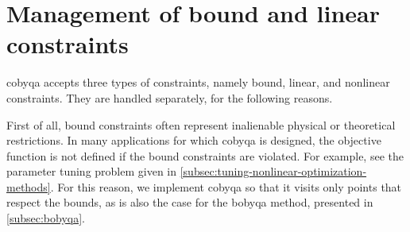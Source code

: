 \section{Management of bound and linear constraints}
\label{sec:simple-constraints}

\Gls{cobyqa} accepts three types of constraints, namely bound, linear, and nonlinear constraints.
They are handled separately, for the following reasons.

First of all, bound constraints often represent inalienable physical or theoretical restrictions.
In many applications for which \gls{cobyqa} is designed, the objective function is not defined if the bound constraints are violated.
For example, see the parameter tuning problem given in \cref{subsec:tuning-nonlinear-optimization-methods}.
For this reason, we implement \gls{cobyqa} so that it visits only points that respect the bounds, as is also the case for the \gls{bobyqa} method, presented in \cref{subsec:bobyqa}.

